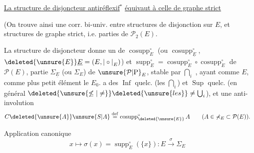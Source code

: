 \uline{La structure de disjoncteur antiréflexif}$^{\ast}$ \uline{équivaut à celle de graphe strict}

(On trouve ainsi une corr. bi-univ. entre structures de disjonction sur $E$, et structures de graphe strict, i.e. parties de $\mathcal{P}_{2}(E)$.

La structure de disjoncteur donne un  de  $\operatorname{cosupp}_{E}^{\circ}$ (ou $\operatorname{cosupp}_{\underline{E}}^{\circ}$,  $\deleted{\unsure{E}}\underline{E}=(E,\mathrel{|\circ|}_{E})$) et $\operatorname{supp}_{E}^{\circ}=\operatorname{cosupp}_{E}^{\circ}\circ\operatorname{cosupp}_{E}^{\circ}$  de $\mathcal{P}(E)$, 
partie $\mathbb{\Sigma}_{\underline{E}}$ (ou $\mathbb{\Sigma}_{E}$) de $\unsure{\mathcal{P}|\mathrm{P}}_{E}$, stable par $\bigcap_{i}$ , ayant comme   $E$, comme plus petit élément le  $E_{0}$.  a des $\operatorname{Inf}$ quelc. (les $\bigcap_{i}$) et $\operatorname{Sup}$ quelc. (en général $\deleted{\unsure{\not\leq|\neq}}\deleted{\unsure{les}}\ne\bigcup_{i}$), et une anti-involution
\[
C\deleted{\unsure{A}}\unsure{S|A}\overset{\mathrm{def}}{=}\operatorname{cosupp}_{\deleted{\unsure{E}}}^{\circ}A
\qquad (A\in\mathbb{\Sigma}_{E}\subset\mathcal{P}(E)).
\]

Application canonique
\[
x\longmapsto\sigma(x)=\operatorname{supp}_{E}^{\circ}(\{x\}):E\xrightarrow{\sigma}\mathbb{\Sigma}_{E}
\]

